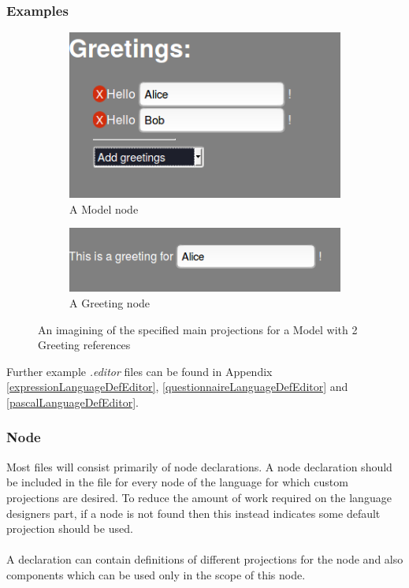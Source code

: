 \documentclass{article}
\begin{document}
{\subsubsection{Examples}

\begin{figure}[t!]
  \centering
  \begin{subfigure}[b]{0.45\linewidth}
    \includegraphics[width=\linewidth]{./Screenshots/greetingsProjection1.png}
    \caption{A Model node}
  \end{subfigure}
  \begin{subfigure}[b]{0.45\linewidth}
	\includegraphics[width=\linewidth]{./Screenshots/greetingsProjection2.png}
    \caption{A Greeting node}
  \end{subfigure}
  \caption{An imagining of the specified main projections for a Model with 2 Greeting references}
  \label{fig:greetingProjection}
\end{figure}

Further example \emph{.editor} files can be found in Appendix \ref{expressionLanguageDefEditor}, \ref{questionnaireLanguageDefEditor} and \ref{pascalLanguageDefEditor}.


\subsubsection{Node}

Most files will consist primarily of node declarations. A node declaration should be included in the file for every node of the language for which custom projections are desired. To reduce the amount of work required on the language designers part, if a node is not found then this instead indicates some default projection should be used.  
\\
\\
A declaration can contain definitions of different projections for the node and also components which can be used only in the scope of this node.

}
\end{document}
